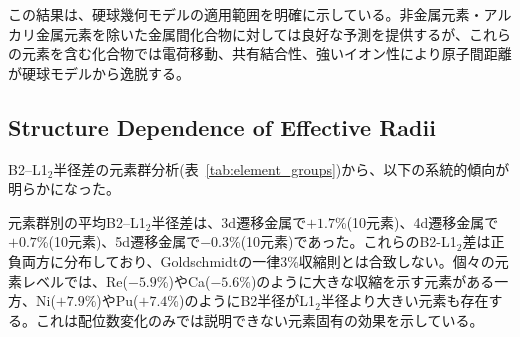 \documentclass[a4paper,10pt,5p]{elsarticle}
\begin{document}

\begin{table}[htbp]
\small
    \centering
    \caption{Effect of non-metallic and alkali metal exclusion on lattice constant prediction accuracy.}
    \label{tab:nonmetal_effect}
\end{table}

この結果は、硬球幾何モデルの適用範囲を明確に示している。非金属元素・アルカリ金属元素を除いた金属間化合物に対しては良好な予測を提供するが、これらの元素を含む化合物では電荷移動、共有結合性、強いイオン性により原子間距離が硬球モデルから逸脱する。

\subsection{Structure Dependence of Effective Radii}

B2--L1$_2$半径差の元素群分析(表~\ref{tab:element_groups})から、以下の系統的傾向が明らかになった。

元素群別の平均B2--L1$_2$半径差は、3d遷移金属で$+1.7$\%(10元素)、4d遷移金属で$+0.7$\%(10元素)、5d遷移金属で$-0.3$\%(10元素)であった。これらのB2-L1$_2$差は正負両方に分布しており、Goldschmidtの一律3\%収縮則とは合致しない。個々の元素レベルでは、Re($-5.9$\%)やCa($-5.6$\%)のように大きな収縮を示す元素がある一方、Ni($+7.9$\%)やPu($+7.4$\%)のようにB2半径がL1$_2$半径より大きい元素も存在する。これは配位数変化のみでは説明できない元素固有の効果を示している。
\end{document}
